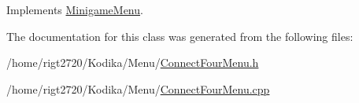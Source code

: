 Implements \hyperlink{classMinigameMenu_abde3ae319bf1660a8626c6f765e054a8}{Minigame\-Menu}.



The documentation for this class was generated from the following files\-:\begin{DoxyCompactItemize}
\item 
/home/rigt2720/\-Kodika/\-Menu/\hyperlink{ConnectFourMenu_8h}{Connect\-Four\-Menu.\-h}\item 
/home/rigt2720/\-Kodika/\-Menu/\hyperlink{ConnectFourMenu_8cpp}{Connect\-Four\-Menu.\-cpp}\end{DoxyCompactItemize}
